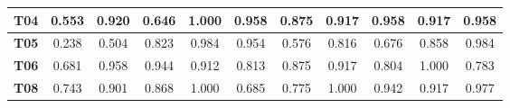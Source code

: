 \begin{table}[htbp]
\begin{tabular}{|c|cccccccccc|}
		\textbf{T04}                                             & \multicolumn{1}{c|}{0.553}                               & \multicolumn{1}{c|}{0.920}                               & \multicolumn{1}{c|}{0.646}                               & \multicolumn{1}{c|}{1.000}                               & \multicolumn{1}{c|}{0.958}                               & \multicolumn{1}{c|}{0.875}                               & \multicolumn{1}{c|}{0.917}                               & \multicolumn{1}{c|}{0.958}                               & \multicolumn{1}{c|}{0.917}                               & 0.958                        \\ \hline
		\rowcolor[HTML]{F2F2F2} 
		\textbf{T05}                                             & \multicolumn{1}{c|}{\cellcolor[HTML]{F2F2F2}0.238}       & \multicolumn{1}{c|}{\cellcolor[HTML]{F2F2F2}0.504}       & \multicolumn{1}{c|}{\cellcolor[HTML]{F2F2F2}0.823}       & \multicolumn{1}{c|}{\cellcolor[HTML]{F2F2F2}0.984}       & \multicolumn{1}{c|}{\cellcolor[HTML]{F2F2F2}0.954}       & \multicolumn{1}{c|}{\cellcolor[HTML]{F2F2F2}0.576}       & \multicolumn{1}{c|}{\cellcolor[HTML]{F2F2F2}0.816}       & \multicolumn{1}{c|}{\cellcolor[HTML]{F2F2F2}0.676}       & \multicolumn{1}{c|}{\cellcolor[HTML]{F2F2F2}0.858}       & 0.984                        \\ \hline
		\textbf{T06}                                             & \multicolumn{1}{c|}{0.681}                               & \multicolumn{1}{c|}{0.958}                               & \multicolumn{1}{c|}{0.944}                               & \multicolumn{1}{c|}{0.912}                               & \multicolumn{1}{c|}{0.813}                               & \multicolumn{1}{c|}{0.875}                               & \multicolumn{1}{c|}{0.917}                               & \multicolumn{1}{c|}{0.804}                               & \multicolumn{1}{c|}{1.000}                               & 0.783                        \\ \hline
		\rowcolor[HTML]{F2F2F2} 
		\textbf{T08}                                             & \multicolumn{1}{c|}{\cellcolor[HTML]{F2F2F2}0.743}       & \multicolumn{1}{c|}{\cellcolor[HTML]{F2F2F2}0.901}       & \multicolumn{1}{c|}{\cellcolor[HTML]{F2F2F2}0.868}       & \multicolumn{1}{c|}{\cellcolor[HTML]{F2F2F2}1.000}       & \multicolumn{1}{c|}{\cellcolor[HTML]{F2F2F2}0.685}       & \multicolumn{1}{c|}{\cellcolor[HTML]{F2F2F2}0.775}       & \multicolumn{1}{c|}{\cellcolor[HTML]{F2F2F2}1.000}       & \multicolumn{1}{c|}{\cellcolor[HTML]{F2F2F2}0.942}       & \multicolumn{1}{c|}{\cellcolor[HTML]{F2F2F2}0.917}       & 0.977                        \\ \hline

\end{tabular}
\end{table}

